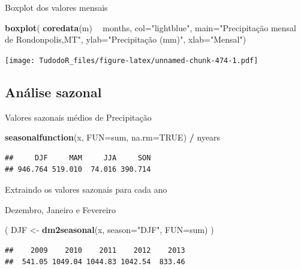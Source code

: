 \documentclass[
]{book}
\newenvironment{Shaded}{\begin{snugshade}}{\end{snugshade}}
\newcommand{\DataTypeTok}[1]{\textcolor[rgb]{0.13,0.29,0.53}{#1}}
\newcommand{\KeywordTok}[1]{\textcolor[rgb]{0.13,0.29,0.53}{\textbf{#1}}}
\newcommand{\NormalTok}[1]{#1}
\newcommand{\OperatorTok}[1]{\textcolor[rgb]{0.81,0.36,0.00}{\textbf{#1}}}
\newcommand{\OtherTok}[1]{\textcolor[rgb]{0.56,0.35,0.01}{#1}}
\newcommand{\StringTok}[1]{\textcolor[rgb]{0.31,0.60,0.02}{#1}}
\begin{document}
Boxplot dos valores mensais

\begin{Shaded}
\begin{Highlighting}[]
\KeywordTok{boxplot}\NormalTok{( }\KeywordTok{coredata}\NormalTok{(m) }\OperatorTok{~}\StringTok{ }\NormalTok{months, }
         \DataTypeTok{col=}\StringTok{"lightblue"}\NormalTok{, }
         \DataTypeTok{main=}\StringTok{"Precipitação mensal de Rondonpolis,MT"}\NormalTok{,}
        \DataTypeTok{ylab=}\StringTok{"Precipitação (mm)"}\NormalTok{, }\DataTypeTok{xlab=}\StringTok{"Mensal"}\NormalTok{)}
\end{Highlighting}
\end{Shaded}

\texttt{[image: TudodoR\_files/figure-latex/unnamed-chunk-474-1.pdf]}

\hypertarget{anuxe1lise-sazonal}{%
\subsection{Análise sazonal}\label{anuxe1lise-sazonal}}

Valores sazonais médios de Precipitação

\begin{Shaded}
\begin{Highlighting}[]
\KeywordTok{seasonalfunction}\NormalTok{(x, }\DataTypeTok{FUN=}\NormalTok{sum, }\DataTypeTok{na.rm=}\OtherTok{TRUE}\NormalTok{) }\OperatorTok{/}\StringTok{ }\NormalTok{nyears}
\end{Highlighting}
\end{Shaded}

\begin{verbatim}
##     DJF     MAM     JJA     SON 
## 946.764 519.010  74.016 390.714
\end{verbatim}

Extraindo os valores sazonais para cada ano

Dezembro, Janeiro e Fevereiro

\begin{Shaded}
\begin{Highlighting}[]
\NormalTok{( DJF <-}\StringTok{ }\KeywordTok{dm2seasonal}\NormalTok{(x, }\DataTypeTok{season=}\StringTok{"DJF"}\NormalTok{, }\DataTypeTok{FUN=}\NormalTok{sum) )}
\end{Highlighting}
\end{Shaded}

\begin{verbatim}
##    2009    2010    2011    2012    2013 
##  541.05 1049.04 1044.83 1042.54  833.46
\end{verbatim}
\end{document}
